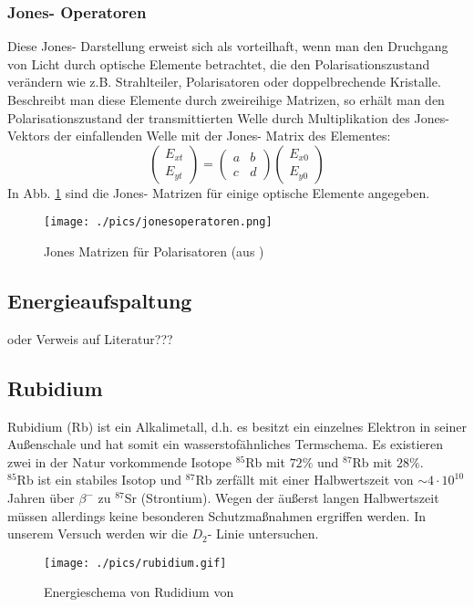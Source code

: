 \documentclass[a4paper,oneside]{article}
\begin{document}
\subsubsection{Jones- Operatoren}
Diese Jones- Darstellung erweist sich als vorteilhaft, wenn man den Druchgang von Licht durch optische Elemente betrachtet, die den Polarisationszustand verändern wie z.B. Strahlteiler, Polarisatoren oder doppelbrechende Kristalle. Beschreibt man diese Elemente durch zweireihige Matrizen, so erhält man den Polarisationszustand der transmittierten Welle durch Multiplikation des Jones- Vektors der einfallenden Welle mit der Jones- Matrix des Elementes:
$$
\left(
\begin{array}{l}
E_{xt}\\
E_{yt}
\end{array}
\right)
=
\left(
\begin{array}{ll}
a&b\\
c&d
\end{array}
\right)
\left(
\begin{array}{l}
E_{x0}\\
E_{y0}
\end{array}
\right)
$$
In Abb. \ref{jonesoperatoren} sind die Jones- Matrizen für einige optische Elemente angegeben.

\begin{figure}[h]
 \centering
 \texttt{[image: ./pics/jonesoperatoren.png]}
 \caption{Jones Matrizen für Polarisatoren (aus \cite{deml})}
 \label{jonesoperatoren}
\end{figure}

\subsection{Energieaufspaltung}
oder Verweis auf Literatur???

\subsection{Rubidium}
Rubidium (Rb) ist ein Alkalimetall, d.h. es besitzt ein einzelnes Elektron in seiner Außenschale und hat somit ein wasserstofähnliches Termschema. Es existieren zwei in der Natur vorkommende Isotope $^{85}$Rb mit $72\%$ und $^{87}$Rb mit $28\%$.\\
$^{85}$Rb ist ein stabiles Isotop und $^{87}$Rb zerfällt mit einer Halbwertszeit von $\sim 4\cdot 10^{10}$ Jahren über $\beta^-$ zu $^{87}$Sr (Strontium). Wegen der äußerst langen Halbwertszeit müssen allerdings keine besonderen Schutzmaßnahmen ergriffen werden. In unserem Versuch werden wir die $D_2$- Linie untersuchen.
\begin{figure}
 \centering
 \texttt{[image: ./pics/rubidium.gif]}
 \caption[Rudidium von \cite{rub2}]{Energieschema von Rudidium von \cite{rub2}}
 \label{Energieschema_von_rubidium}
\end{figure}
\end{document}
